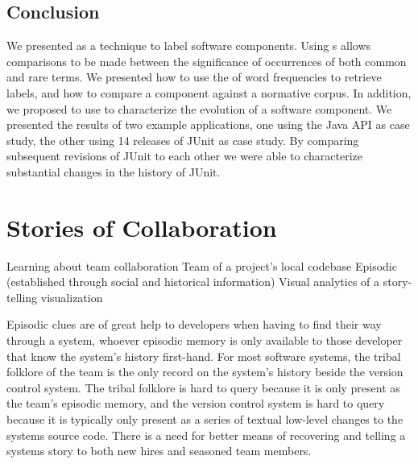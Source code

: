 

\section{Conclusion}\label{eventually}

We presented \loglr as a technique to label software components. Using \loglr{}s allows comparisons to be made between the significance of occurrences of both common and rare terms. We presented how to use the \loglr of word frequencies to retrieve labels, and how to compare a component against a normative corpus. In addition, we proposed to use \loglrs to characterize the evolution of a software component. We presented the results of two example applications, one using the Java API as case study, the other using 14 releases of JUnit as case study. By comparing subsequent revisions of JUnit to each other we were able to characterize substantial changes in the history of JUnit.


\chapter{Stories of Collaboration}
\label{the chapter on chronia}

\infobox
	{Learning about team collaboration}
	{Team of a project's local codebase}
	{Episodic (established through social and historical information)}
	{Visual analytics of a story-telling visualization}

Episodic clues are of great help to developers when having to find their way through a system, whoever episodic memory is only available to those developer that know the system's history first-hand. For most software systems, the tribal folklore of the team is the only record on the system's history beside the version control system. The tribal folklore is hard to query because it is only present as the team's episodic memory, and the version control system is hard to query because it is typically only present as a series of textual low-level changes to the systems source code. There is a need for better means of recovering and telling a systems story to both new hires and seasoned team members.

